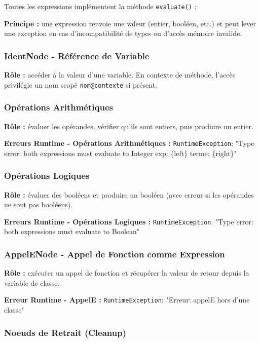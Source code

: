 Toutes les expressions implémentent la méthode \texttt{evaluate()} :

\noindent\textbf{Principe :} une expression renvoie une valeur (entier, booléen, etc.) et peut lever une exception en cas d'incompatibilité de types ou d'accès mémoire invalide.

\subsubsection{IdentNode - Référence de Variable}

\noindent\textbf{Rôle :} accéder à la valeur d'une variable. En contexte de méthode, l'accès privilégie un nom scopé \texttt{nom@contexte} si présent.

\subsubsection{Opérations Arithmétiques}

\noindent\textbf{Rôle :} évaluer les opérandes, vérifier qu'ils sont entiers, puis produire un entier.

\noindent\textbf{Erreurs Runtime - Opérations Arithmétiques :} \texttt{RuntimeException}: "Type error: both expressions must evaluate to Integer exp: \{left\} terme: \{right\}"

\subsubsection{Opérations Logiques}

\noindent\textbf{Rôle :} évaluer des booléens et produire un booléen (avec erreur si les opérandes ne sont pas booléens).

\noindent\textbf{Erreurs Runtime - Opérations Logiques :} \texttt{RuntimeException}: "Type error: both expressions must evaluate to Boolean"

\subsubsection{AppelENode - Appel de Fonction comme Expression}

\noindent\textbf{Rôle :} exécuter un appel de fonction et récupérer la valeur de retour depuis la variable de classe.

\noindent\textbf{Erreur Runtime - AppelE :} \texttt{RuntimeException}: "Erreur: appelE hors d'une classe"

\subsubsection{Noeuds de Retrait (Cleanup)}

